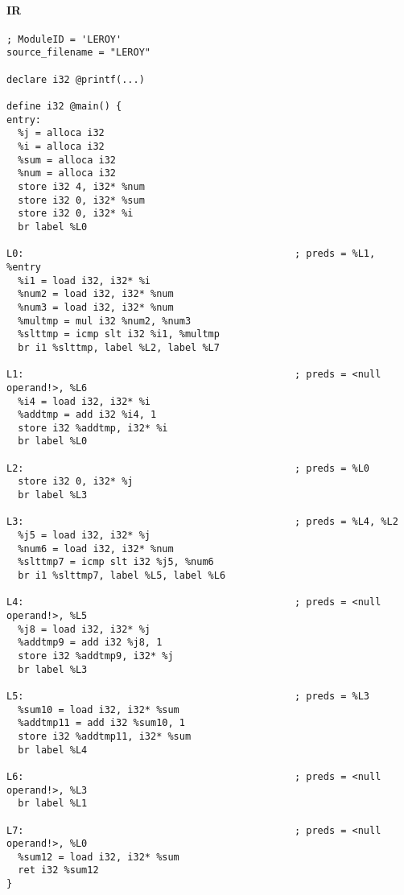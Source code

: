 \documentclass[12pt]{article}
\begin{document}
    \paragraph{IR}
    \begin{verbatim}
; ModuleID = 'LEROY'
source_filename = "LEROY"

declare i32 @printf(...)

define i32 @main() {
entry:
  %j = alloca i32
  %i = alloca i32
  %sum = alloca i32
  %num = alloca i32
  store i32 4, i32* %num
  store i32 0, i32* %sum
  store i32 0, i32* %i
  br label %L0

L0:                                               ; preds = %L1, %entry
  %i1 = load i32, i32* %i
  %num2 = load i32, i32* %num
  %num3 = load i32, i32* %num
  %multmp = mul i32 %num2, %num3
  %slttmp = icmp slt i32 %i1, %multmp
  br i1 %slttmp, label %L2, label %L7

L1:                                               ; preds = <null operand!>, %L6
  %i4 = load i32, i32* %i
  %addtmp = add i32 %i4, 1
  store i32 %addtmp, i32* %i
  br label %L0

L2:                                               ; preds = %L0
  store i32 0, i32* %j
  br label %L3

L3:                                               ; preds = %L4, %L2
  %j5 = load i32, i32* %j
  %num6 = load i32, i32* %num
  %slttmp7 = icmp slt i32 %j5, %num6
  br i1 %slttmp7, label %L5, label %L6

L4:                                               ; preds = <null operand!>, %L5
  %j8 = load i32, i32* %j
  %addtmp9 = add i32 %j8, 1
  store i32 %addtmp9, i32* %j
  br label %L3

L5:                                               ; preds = %L3
  %sum10 = load i32, i32* %sum
  %addtmp11 = add i32 %sum10, 1
  store i32 %addtmp11, i32* %sum
  br label %L4

L6:                                               ; preds = <null operand!>, %L3
  br label %L1

L7:                                               ; preds = <null operand!>, %L0
  %sum12 = load i32, i32* %sum
  ret i32 %sum12
}
    \end{verbatim}

	\section*{}
\end{document}
